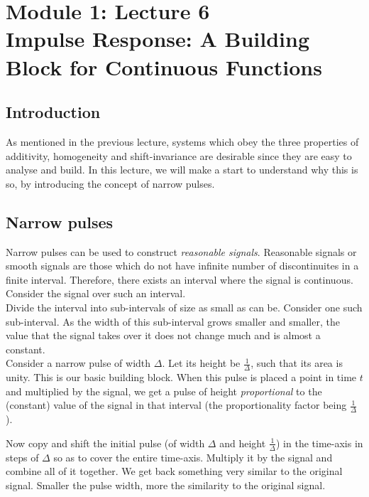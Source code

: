 \section{Module 1: Lecture 6\\ Impulse Response: A Building Block for Continuous Functions}

	

\subsection{Introduction}
As mentioned in the previous lecture, systems which obey the three properties of additivity, homogeneity and shift-invariance are desirable since they are easy to analyse and build. In this lecture, we will make a start to understand why this is so, by introducing the concept of narrow pulses. 

\subsection{Narrow pulses}
Narrow pulses can be used to construct \textit{reasonable signals}. Reasonable signals or smooth signals are those which do not have infinite number of discontinuites in a finite interval. Therefore, there exists an interval where the signal is continuous. Consider the signal over such an interval. 
\\

Divide the interval into sub-intervals of size as small as can be. Consider one such sub-interval. As the width of this sub-interval grows smaller and smaller, the value that the signal takes over it does not change much and is almost a constant. 
\\

Consider a narrow pulse of width $\Delta$. Let its height be $\frac{1}{\Delta}$, such that its area is unity. This is our basic building block. When this pulse is placed a point in time $t$ and multiplied by the signal, we get a pulse of height \textit{proportional} to the (constant) value of the signal in that interval (the proportionality factor being  $\frac{1}{\Delta}$). 

Now copy and shift the initial pulse (of width $\Delta$ and height $\frac{1}{\Delta}$) in the time-axis in steps of $\Delta$ so as to cover the entire time-axis. Multiply it by the signal and combine all of it together. We get back something very similar to the original signal. Smaller the pulse width, more the similarity to the original signal. 

